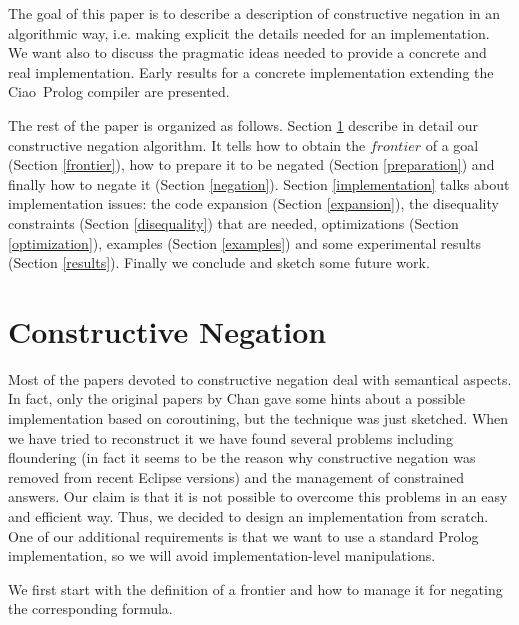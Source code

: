 \documentclass{llncs}
\newcommand{\ciao}{Ciao}
\begin{document}
The goal of this paper is to describe a description of constructive negation
in an algorithmic way, i.e. making explicit the details needed for an 
implementation. We want also to discuss the pragmatic ideas needed to
provide a concrete and real implementation. Early results for a concrete 
implementation extending the \ciao\ Prolog compiler are presented.


The rest of the paper is organized as follows. Section
\ref{constructive} describe in detail our constructive negation
algorithm. It tells how to obtain the $frontier$ of a goal (Section
\ref{frontier}), how to prepare it to be negated (Section
\ref{preparation}) and finally how to negate it (Section
\ref{negation}). Section \ref{implementation} talks about
implementation issues: the code expansion (Section \ref{expansion}),
the disequality constraints (Section \ref{disequality}) that are
needed, optimizations (Section \ref{optimization}), examples (Section
\ref{examples}) and some experimental results (Section \ref{results}).
Finally we conclude and sketch some future work.
 


\section{Constructive Negation}
\label{constructive}

Most of the papers devoted to constructive negation deal 
with semantical aspects. In fact, only the original papers by Chan gave some hints
about a possible implementation based on coroutining, but the
technique was just sketched. When we have tried to reconstruct it we
have found several problems including floundering (in fact it seems to
be the reason why constructive negation was removed from recent
Eclipse versions) and the management of constrained answers. 
Our claim is that it is not possible to overcome this problems in an easy
and efficient way.
Thus, we decided to design an implementation from
scratch.  One of our additional requirements is 
that we want to use a standard Prolog implementation, so we
will avoid implementation-level manipulations.

We first start with the definition of a frontier and how to manage it for
negating the corresponding formula.
\end{document}
